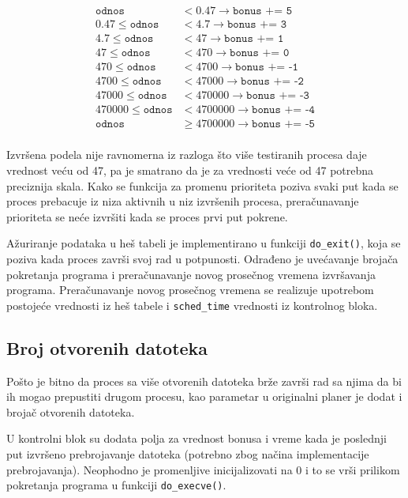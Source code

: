 \begin{align*}
    \texttt{odnos} & < 0.47 \rightarrow \texttt{bonus += 5} \\
    0.47 \leq \texttt{odnos} & < 4.7 \rightarrow \texttt{bonus += 3} \\
    4.7 \leq \texttt{odnos} & < 47 \rightarrow \texttt{bonus += 1} \\
    47 \leq \texttt{odnos} & < 470 \rightarrow \texttt{bonus += 0} \\
    470 \leq \texttt{odnos} & < 4700 \rightarrow \texttt{bonus += -1} \\
    4700 \leq \texttt{odnos} & < 47000 \rightarrow \texttt{bonus += -2} \\
    47000 \leq \texttt{odnos} & < 470000 \rightarrow \texttt{bonus += -3} \\
    470000 \leq \texttt{odnos} & < 4700000 \rightarrow \texttt{bonus += -4} \\
    \texttt{odnos} & \geq 4700000 \rightarrow \texttt{bonus += -5} \\
\end{align*}

Izvršena podela nije ravnomerna iz razloga što više testiranih procesa daje vrednost veću od 47, pa je smatrano da je za vrednosti veće od 47 potrebna preciznija skala. Kako se funkcija za promenu prioriteta poziva svaki put kada se proces prebacuje iz niza aktivnih u niz izvršenih procesa, preračunavanje prioriteta se neće izvršiti kada se proces prvi put pokrene.

Ažuriranje podataka u heš tabeli je implementirano u funkciji \texttt{do\_exit()}, koja se poziva kada proces završi svoj rad u potpunosti. Odrađeno je uvećavanje brojača pokretanja programa i preračunavanje novog prosečnog vremena izvršavanja programa. Preračunavanje novog prosečnog vremena se realizuje upotrebom postojeće vrednosti iz heš tabele i \texttt{sched\_time} vrednosti iz kontrolnog bloka.


\subsection{Broj otvorenih datoteka}

Pošto je bitno da proces sa više otvorenih datoteka brže završi rad sa njima da bi ih mogao
prepustiti drugom procesu, kao parametar u originalni planer je dodat i brojač otvorenih
datoteka.

U kontrolni blok su dodata polja za vrednost bonusa i vreme kada je poslednji put izvršeno
prebrojavanje datoteka (potrebno zbog načina implementacije prebrojavanja). Neophodno je
promenljive inicijalizovati na 0 i to se vrši prilikom pokretanja programa u funkciji
\verb|do_execve()|.

